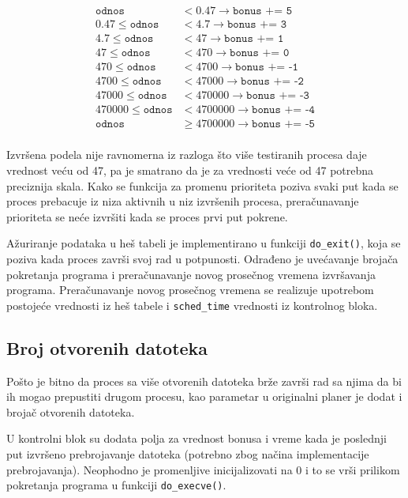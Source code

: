 \begin{align*}
    \texttt{odnos} & < 0.47 \rightarrow \texttt{bonus += 5} \\
    0.47 \leq \texttt{odnos} & < 4.7 \rightarrow \texttt{bonus += 3} \\
    4.7 \leq \texttt{odnos} & < 47 \rightarrow \texttt{bonus += 1} \\
    47 \leq \texttt{odnos} & < 470 \rightarrow \texttt{bonus += 0} \\
    470 \leq \texttt{odnos} & < 4700 \rightarrow \texttt{bonus += -1} \\
    4700 \leq \texttt{odnos} & < 47000 \rightarrow \texttt{bonus += -2} \\
    47000 \leq \texttt{odnos} & < 470000 \rightarrow \texttt{bonus += -3} \\
    470000 \leq \texttt{odnos} & < 4700000 \rightarrow \texttt{bonus += -4} \\
    \texttt{odnos} & \geq 4700000 \rightarrow \texttt{bonus += -5} \\
\end{align*}

Izvršena podela nije ravnomerna iz razloga što više testiranih procesa daje vrednost veću od 47, pa je smatrano da je za vrednosti veće od 47 potrebna preciznija skala. Kako se funkcija za promenu prioriteta poziva svaki put kada se proces prebacuje iz niza aktivnih u niz izvršenih procesa, preračunavanje prioriteta se neće izvršiti kada se proces prvi put pokrene.

Ažuriranje podataka u heš tabeli je implementirano u funkciji \texttt{do\_exit()}, koja se poziva kada proces završi svoj rad u potpunosti. Odrađeno je uvećavanje brojača pokretanja programa i preračunavanje novog prosečnog vremena izvršavanja programa. Preračunavanje novog prosečnog vremena se realizuje upotrebom postojeće vrednosti iz heš tabele i \texttt{sched\_time} vrednosti iz kontrolnog bloka.


\subsection{Broj otvorenih datoteka}

Pošto je bitno da proces sa više otvorenih datoteka brže završi rad sa njima da bi ih mogao
prepustiti drugom procesu, kao parametar u originalni planer je dodat i brojač otvorenih
datoteka.

U kontrolni blok su dodata polja za vrednost bonusa i vreme kada je poslednji put izvršeno
prebrojavanje datoteka (potrebno zbog načina implementacije prebrojavanja). Neophodno je
promenljive inicijalizovati na 0 i to se vrši prilikom pokretanja programa u funkciji
\verb|do_execve()|.

